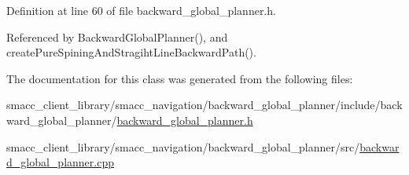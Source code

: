 Definition at line 60 of file backward\+\_\+global\+\_\+planner.\+h.



Referenced by Backward\+Global\+Planner(), and create\+Pure\+Spining\+And\+Stragiht\+Line\+Backward\+Path().



The documentation for this class was generated from the following files\+:\begin{DoxyCompactItemize}
\item 
smacc\+\_\+client\+\_\+library/smacc\+\_\+navigation/backward\+\_\+global\+\_\+planner/include/backward\+\_\+global\+\_\+planner/\hyperlink{backward__global__planner_8h}{backward\+\_\+global\+\_\+planner.\+h}\item 
smacc\+\_\+client\+\_\+library/smacc\+\_\+navigation/backward\+\_\+global\+\_\+planner/src/\hyperlink{backward__global__planner_8cpp}{backward\+\_\+global\+\_\+planner.\+cpp}\end{DoxyCompactItemize}
